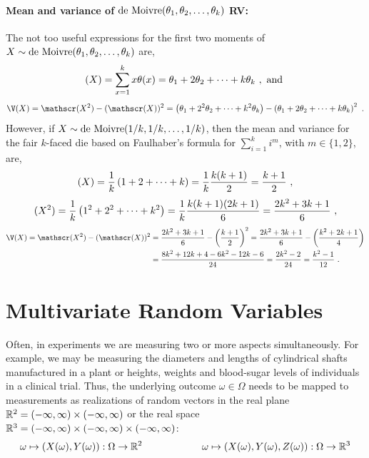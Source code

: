 \paragraph{Mean and variance of $\mbox{{\rm de~Moivre}} (\theta_1,\theta_2,\ldots,\theta_k)$ RV:}
The not too useful expressions for the first two moments of $X \sim \mbox{{\rm de~Moivre}} (\theta_1,\theta_2,\ldots,\theta_k)$ are,
\[
\mathscr{(}X) = \sum_{x=1}^k x \theta(x) =  \theta_1 + 2 \theta_2 + \cdots + k \theta_k \ , \text{ and }
\]
\[
\V(X) = \E(X^2) - (\E(X))^2 =   \left(\theta_1 + 2^2 \theta_2 + \cdots + k^2 \theta_k \right) - \left( \theta_1 + 2 \theta_2 + \cdots + k \theta_k \right)^2 \ .
\]
However, if $X\sim \mbox{{\rm de~Moivre}}(1/k,1/k,\ldots,1/k)$, then the mean and variance for the fair $k$-faced die based on Faulhaber's formula for $\sum_{i=1}^k i^m$, with $m\in\{1,2\}$, are,
\[
\E(X) = \frac{1}{k} \left( 1+2+\cdots+k \right)= \frac{1}{k} \frac{k(k+1)}{2} = \frac{k+1}{2}  \ ,
\]
\[
\mathscr{(}X^2) = \frac{1}{k} \left( 1^2+2^2+\cdots+k^2 \right)  = \frac{1}{k} \frac{k(k+1)(2k+1)}{6} =  \frac{2k^2+3k+1}{6} \ ,
\]
\begin{align}
\V(X) = \E(X^2) - (\E(X))^2
&= \frac{2k^2+3k+1}{6} -  \left( \frac{k+1}{2} \right)^2 = \frac{2k^2+3k+1}{6} -  \left( \frac{k^2+2k+1}{4} \right) \notag \\
&=  \frac{8k^2+12k+4 - 6k^2-12k-6}{24} =  \frac{2k^2-2}{24} = \frac{k^2-1}{12} \notag \ .
\end{align}




\section{Multivariate Random Variables}\label{S:RVecs}

Often, in experiments we are measuring two or more aspects simultaneously.  
For example, we may be measuring the diameters and lengths of cylindrical shafts manufactured in a plant or heights, weights and blood-sugar levels of individuals in a clinical trial.  
Thus, the underlying outcome $\omega \in \Omega$ needs to be mapped to measurements as realizations of random vectors in the real plane $\mathbb{R}^2 = (-\infty, \infty) \times (-\infty, \infty)$ or the real space $\mathbb{R}^3 = (-\infty, \infty) \times (-\infty, \infty) \times (-\infty, \infty)$:
\[
\omega \mapsto \left( X(\omega),Y(\omega) \right) : \Omega \to \mathbb{R}^2  \qquad \qquad \qquad \omega \mapsto \left( X(\omega),Y(\omega), Z(\omega) \right) : \Omega \to \mathbb{R}^3
\]

